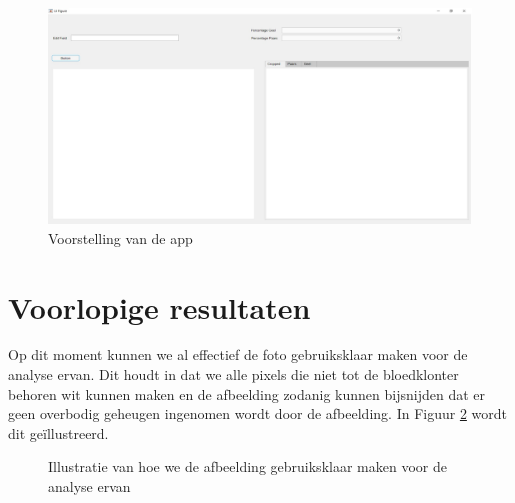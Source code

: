\documentclass[a4paper,kulak]{kulakarticle}
\begin{document}
		\begin{figure}[H]
		\centering
		\includegraphics[width=170mm]{app.jpg}
		\caption{Voorstelling van de app}
		\label{fig: app}
		\end{figure}
	
		
	

	\section{Voorlopige resultaten}		
		Op dit moment kunnen we al effectief de foto gebruiksklaar maken voor de analyse ervan. Dit houdt in dat we alle pixels die niet tot de bloedklonter behoren wit kunnen maken en de afbeelding zodanig kunnen bijsnijden dat er geen overbodig geheugen ingenomen wordt door de afbeelding. In Figuur \ref{fig: voorna} wordt dit geïllustreerd.\\
	
		\begin{figure}[H]
		\centering
		\qquad
		
		\caption{Illustratie van hoe we de afbeelding gebruiksklaar maken voor de analyse ervan}
		\label{fig: voorna}
		\end{figure}
		
\end{document}
